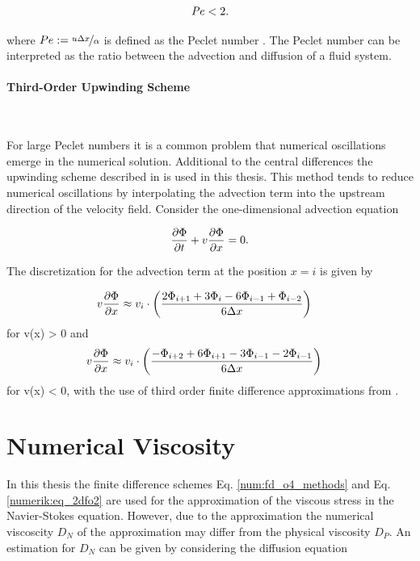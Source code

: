 \begin{align}
    \Pe  < 2.
\end{align}

where $ Pe := \nicefrac{u \Delta x}{\alpha}$ is defined as the Peclet number \citep{ferziger99}.
The Peclet number can be interpreted as the ratio between the advection and diffusion of a fluid system.

\paragraph{Third-Order Upwinding Scheme}\mbox{}\\
\label{num:sec_para:upwindingscheme}

For large Peclet numbers it is a common problem that numerical oscillations emerge in the numerical solution.
Additional to the central differences the upwinding scheme described in \citep{ferziger99} is used in this thesis.
This method tends to reduce numerical oscillations by interpolating
the advection term into the upstream direction of the velocity field.
Consider the one-dimensional advection equation

\begin{align}
    \pdn[\Phi]{t} + v\pdn[\Phi]{x} = 0.
\end{align}

The discretization for the advection term at the position $x=i$ is given by

\begin{align}
    v\pdn[\Phi]{x} &\approx  v_i \cdot \left(\frac{2\Phi_{i+1} + 3\Phi_i     - 6\Phi_{i-1} + \Phi_{i-2}}{6\Delta x}\right)
\end{align}
for v(x) > 0 and
\begin{align}
    v\pdn[\Phi]{x} &\approx  v_i \cdot \left( \frac{-\Phi_{i+2} + 6\Phi_{i+1} - 3\Phi_{i-1} - 2\Phi_{i-1}}{6\Delta x}\right)
\end{align}
for v(x) < 0,
with the use of third order finite difference approximations from \citep{ferziger99}.

\newpage

\section{Numerical Viscosity}

In this thesis the finite difference schemes Eq. \ref{num:fd_o4_methods} and Eq. \ref{numerik:eq_2dfo2}
are used for the approximation of the viscous stress in the Navier-Stokes equation.
However, due to the approximation the numerical viscoscity $D_N$ of the approximation may differ from the physical viscosity $D_P$.
An estimation for $D_N$ can be given by considering the diffusion equation

